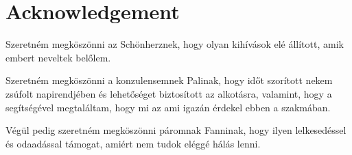 \chapter*{Acknowledgement}

Szeretn\'{e}m megk\"{o}sz\"{o}nni az Sch\"{o}nherznek, hogy olyan kih\'{i}v\'{a}sok el\'{e} \'{a}ll\'{i}tott, amik embert neveltek bel\H{o}lem.

Szeretn\'{e}m megk\"{o}sz\"{o}nni a konzulensemnek Palinak, hogy id\H{o}t szor\'{i}tott nekem zs\'{u}folt napirendj\'{e}ben \'{e}s lehet\H{o}s\'{e}get biztos\'{i}tott az alkot\'{a}sra, valamint, hogy a seg\'{i}ts\'{e}g\'{e}vel megtal\'{a}ltam, hogy mi az ami igaz\'{a}n \'{e}rdekel ebben a szakm\'{a}ban.

V\'{e}g\"{u}l pedig szeretn\'{e}m megk\"{o}sz\"{o}nni p\'{a}romnak Fanninak, hogy ilyen lelkesed\'{e}ssel \'{e}s odaad\'{a}ssal t\'{a}mogat, ami\'{e}rt nem tudok el\'{e}gg\'{e} h\'{a}l\'{a}s lenni.